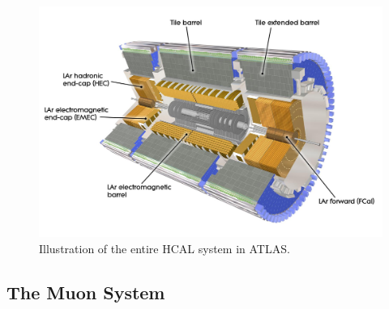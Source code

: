 \begin{figure}[H]
  \centering
  \includegraphics[scale=0.5]{figs/ch3/calorimeters.jpg}
  \caption{  Illustration of the entire HCAL system in ATLAS. \cite{atlas}}
\label{fig:3.12}
\end{figure}

\subsection{The Muon System}

